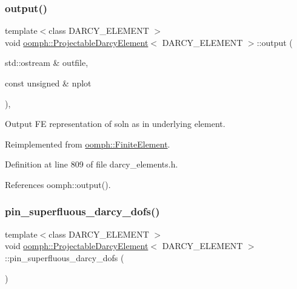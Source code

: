 \subsubsection{\texorpdfstring{output()}{output()}}
{\footnotesize\ttfamily template$<$class D\+A\+R\+C\+Y\+\_\+\+E\+L\+E\+M\+E\+NT $>$ \\
void \hyperlink{classoomph_1_1ProjectableDarcyElement}{oomph\+::\+Projectable\+Darcy\+Element}$<$ D\+A\+R\+C\+Y\+\_\+\+E\+L\+E\+M\+E\+NT $>$\+::output (\begin{DoxyParamCaption}\item[{std\+::ostream \&}]{outfile,  }\item[{const unsigned \&}]{nplot }\end{DoxyParamCaption})\hspace{0.3cm}{\ttfamily [inline]}, {\ttfamily [virtual]}}



Output FE representation of soln as in underlying element. 



Reimplemented from \hyperlink{classoomph_1_1FiniteElement_afa9d9b2670f999b43e6679c9dd28c457}{oomph\+::\+Finite\+Element}.



Definition at line 809 of file darcy\+\_\+elements.\+h.



References oomph\+::output().

\mbox{\label{classoomph_1_1ProjectableDarcyElement_a9ef8e257420ab1ef09862ca1cedd25c0}} 
\subsubsection{\texorpdfstring{pin\+\_\+superfluous\+\_\+darcy\+\_\+dofs()}{pin\_superfluous\_darcy\_dofs()}}
{\footnotesize\ttfamily template$<$class D\+A\+R\+C\+Y\+\_\+\+E\+L\+E\+M\+E\+NT $>$ \\
void \hyperlink{classoomph_1_1ProjectableDarcyElement}{oomph\+::\+Projectable\+Darcy\+Element}$<$ D\+A\+R\+C\+Y\+\_\+\+E\+L\+E\+M\+E\+NT $>$\+::pin\+\_\+superfluous\+\_\+darcy\+\_\+dofs (\begin{DoxyParamCaption}{ }\end{DoxyParamCaption})\hspace{0.3cm}{\ttfamily [inline]}}



